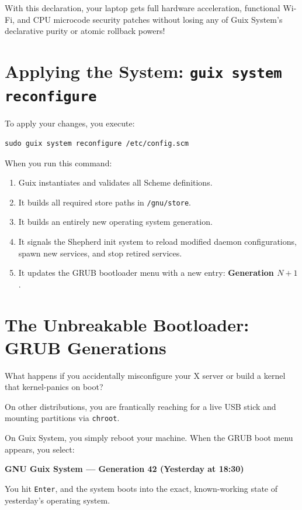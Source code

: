 With this declaration, your laptop gets full hardware acceleration, functional Wi-Fi, and CPU microcode security patches without losing any of Guix System's declarative purity or atomic rollback powers!

\section{Applying the System: \texttt{guix system reconfigure}}

To apply your changes, you execute:

\begin{lstlisting}[style=guixcli]
sudo guix system reconfigure /etc/config.scm
\end{lstlisting}

When you run this command:
\begin{enumerate}
  \item Guix instantiates and validates all Scheme definitions.
  \item It builds all required store paths in \texttt{/gnu/store}.
  \item It builds an entirely new operating system generation.
  \item It signals the Shepherd init system to reload modified daemon configurations, spawn new services, and stop retired services.
  \item It updates the GRUB bootloader menu with a new entry: \textbf{Generation $N+1$}.
\end{enumerate}

\section{The Unbreakable Bootloader: GRUB Generations}

What happens if you accidentally misconfigure your X server or build a kernel that kernel-panics on boot?

On other distributions, you are frantically reaching for a live USB stick and mounting partitions via \texttt{chroot}.

On Guix System, you simply reboot your machine. When the GRUB boot menu appears, you select:

\begin{center}
\textbf{GNU Guix System --- Generation 42 (Yesterday at 18:30)}
\end{center}

You hit \texttt{Enter}, and the system boots into the exact, known-working state of yesterday's operating system. 

